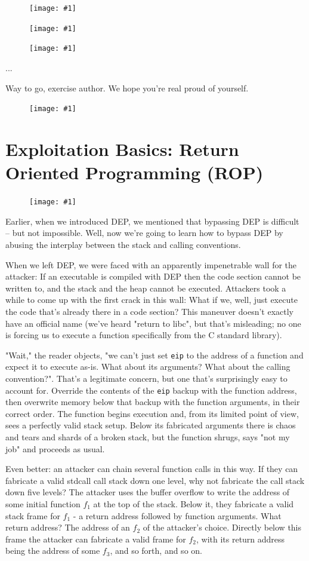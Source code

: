 \documentclass{article}
\newcommand{\displayimage}[1] {
\begin{figure}[H]
    \centering
    \texttt{[image: \#1]} 
\end{figure}
}
\newcommand{\wrapimageright}[1] {
    \begin{figure}
        \begin{center}
            \texttt{[image: \#1]} 
        \end{center}
    \end{figure}
}
\newcommand{\xcode}[2]{\colorbox{ubuntuback}{\lstinline[language=#1]|#2|}}
\newcommand{\asm}[1]{\xcode{{[x86masm]assembler}}{#1}}
\begin{document}
\displayimage{./exercises/19_blukat/python.png}
\displayimage{./exercises/19_blukat/nano.png}
\displayimage{./exercises/19_blukat/xxd.png}

...

Way to go, exercise author. We hope you're real proud of yourself.

\displayimage{./exercises/19_blukat/solution.png}

\section{Exploitation Basics: Return Oriented Programming (ROP)}

\wrapimageright{./images/rop_stack_layout.png}
Earlier, when we introduced DEP, we mentioned that bypassing DEP is difficult -- but not impossible. Well, now we're going to learn how to bypass DEP by abusing the interplay between the stack and calling conventions.

When we left DEP, we were faced with an apparently impenetrable wall for the attacker: If an executable is compiled with DEP then the code section cannot be written to, and the stack and the heap cannot be executed. Attackers took a while to come up with the first crack in this wall: What if we, well, just execute the code that's already there in a code section? This maneuver doesn't exactly have an official name (we've heard "return to libc", but that's misleading; no one is forcing us to execute a function specifically from the C standard library).

"Wait," the reader objects, "we can't just set \asm{eip} to the address of a function and expect it to execute as-is. What about its arguments? What about the calling convention?". That's a legitimate concern, but one that's surprisingly easy to account for. Override the contents of the \asm{eip} backup with the function address, then overwrite memory below that backup with the function arguments, in their correct order. The function begins execution and, from its limited point of view, sees a perfectly valid stack setup. Below its fabricated arguments there is chaos and tears and shards of a broken stack, but the function shrugs, says "not my job" and proceeds as usual.

Even better: an attacker can chain several function calls in this way. If they can fabricate a valid stdcall call stack down one level, why not fabricate the call stack down five levels? The attacker uses the buffer overflow to write the address of some initial function $f_1$ at the top of the stack. Below it, they fabricate a valid stack frame for $f_1$ - a return address followed by function arguments. What return address? The address of an $f_2$ of the attacker's choice. Directly below this frame the attacker can fabricate a valid frame for $f_2$, with its return address being the address of some $f_3$, and so forth, and so on.
\end{document}
